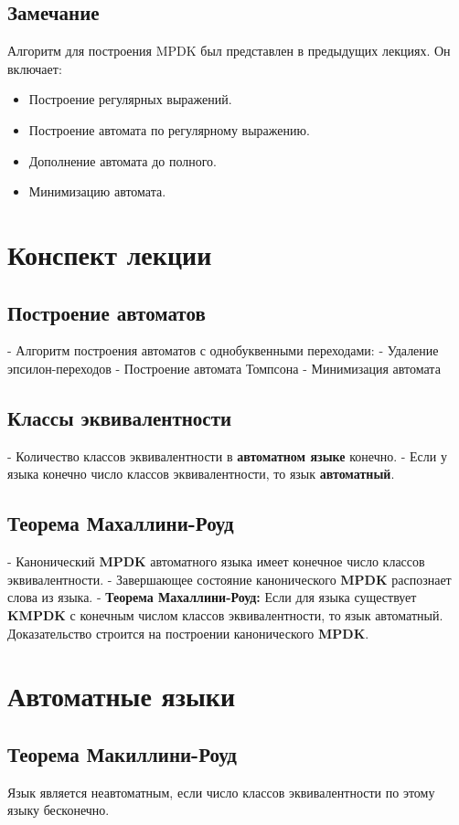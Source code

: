 \documentclass{article}
\begin{document}
\begin{itemize}
\subsection{Замечание}
Алгоритм для построения MPDK был представлен в предыдущих лекциях. Он включает:
\begin{itemize}
  \item Построение регулярных выражений.
  \item Построение автомата по регулярному выражению.
  \item Дополнение автомата до полного.
  \item Минимизацию автомата.
\end{itemize}
\section{Конспект лекции}
\subsection{Построение автоматов}
- Алгоритм построения автоматов с однобуквенными переходами:
  - Удаление эпсилон-переходов
  - Построение автомата Томпсона
  - Минимизация автомата

\subsection{Классы эквивалентности}
- Количество классов эквивалентности в \textbf{автоматном языке} конечно.
- Если у языка конечно число классов эквивалентности, то язык \textbf{автоматный}.

\subsection{Теорема Махаллини-Роуд}
- Канонический \textbf{MPDK} автоматного языка имеет конечное число классов эквивалентности.
- Завершающее состояние канонического \textbf{MPDK} распознает слова из языка.
- \textbf{Теорема Махаллини-Роуд:} Если для языка существует \textbf{KMPDK} с конечным числом классов эквивалентности, то язык автоматный. Доказательство строится на построении канонического \textbf{MPDK}.
\section{Автоматные языки}
\subsection{Теорема Макиллини-Роуд}
Язык является неавтоматным, если число классов эквивалентности по этому языку бесконечно.


\end{itemize}
\end{document}
